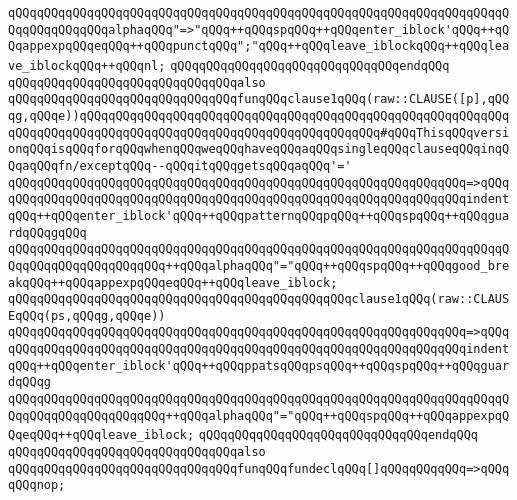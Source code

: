 \verb|qQQqqQQqqQQqqQQqqQQqqQQqqQQqqQQqqQQqqQQqqQQqqQQqqQQqqQQqqQQqqQQqqQQqqQQqqQQqqQQqqQQqalphaqQQq"=>"qQQq++qQQqspqQQq++qQQqenter_iblock'qQQq++qQQqappexpqQQqeqQQq++qQQqpunctqQQq";"qQQq++qQQqleave_iblockqQQq++qQQqleave_iblockqQQq++qQQqnl;|\newline
\verb|qQQqqQQqqQQqqQQqqQQqqQQqqQQqqQQqendqQQq|\newline
\newline
\verb|qQQqqQQqqQQqqQQqqQQqqQQqqQQqqQQqalso|\newline
\verb|qQQqqQQqqQQqqQQqqQQqqQQqqQQqqQQqfunqQQqclause1qQQq(raw::CLAUSE([p],qQQqg,qQQqe))qQQqqQQqqQQqqQQqqQQqqQQqqQQqqQQqqQQqqQQqqQQqqQQqqQQqqQQqqQQqqQQqqQQqqQQqqQQqqQQqqQQqqQQqqQQqqQQqqQQqqQQqqQQqqQQq#qQQqThisqQQqversionqQQqisqQQqforqQQqwhenqQQqweqQQqhaveqQQqaqQQqsingleqQQqclauseqQQqinqQQqaqQQqfn/exceptqQQq--qQQqitqQQqgetsqQQqaqQQq'='|\newline
\verb|qQQqqQQqqQQqqQQqqQQqqQQqqQQqqQQqqQQqqQQqqQQqqQQqqQQqqQQqqQQqqQQq=>qQQq|\newline
\verb|qQQqqQQqqQQqqQQqqQQqqQQqqQQqqQQqqQQqqQQqqQQqqQQqqQQqqQQqqQQqqQQqindentqQQq++qQQqenter_iblock'qQQq++qQQqpatternqQQqpqQQq++qQQqspqQQq++qQQqguardqQQqgqQQq|\newline
\verb|qQQqqQQqqQQqqQQqqQQqqQQqqQQqqQQqqQQqqQQqqQQqqQQqqQQqqQQqqQQqqQQqqQQqqQQqqQQqqQQqqQQqqQQqqQQq++qQQqalphaqQQq"="qQQq++qQQqspqQQq++qQQqgood_breakqQQq++qQQqappexpqQQqeqQQq++qQQqleave_iblock;|\newline
\newline
\verb|qQQqqQQqqQQqqQQqqQQqqQQqqQQqqQQqqQQqqQQqqQQqqQQqclause1qQQq(raw::CLAUSEqQQq(ps,qQQqg,qQQqe))|\newline
\verb|qQQqqQQqqQQqqQQqqQQqqQQqqQQqqQQqqQQqqQQqqQQqqQQqqQQqqQQqqQQqqQQq=>qQQq|\newline
\verb|qQQqqQQqqQQqqQQqqQQqqQQqqQQqqQQqqQQqqQQqqQQqqQQqqQQqqQQqqQQqqQQqindentqQQq++qQQqenter_iblock'qQQq++qQQqppatsqQQqpsqQQq++qQQqspqQQq++qQQqguardqQQqg|\newline
\verb|qQQqqQQqqQQqqQQqqQQqqQQqqQQqqQQqqQQqqQQqqQQqqQQqqQQqqQQqqQQqqQQqqQQqqQQqqQQqqQQqqQQqqQQqqQQq++qQQqalphaqQQq"="qQQq++qQQqspqQQq++qQQqappexpqQQqeqQQq++qQQqleave_iblock;|\newline
\verb|qQQqqQQqqQQqqQQqqQQqqQQqqQQqqQQqendqQQq|\newline
\newline
\verb|qQQqqQQqqQQqqQQqqQQqqQQqqQQqqQQqalso|\newline
\verb|qQQqqQQqqQQqqQQqqQQqqQQqqQQqqQQqfunqQQqfundeclqQQq[]qQQqqQQqqQQq=>qQQqqQQqnop;|\newline
